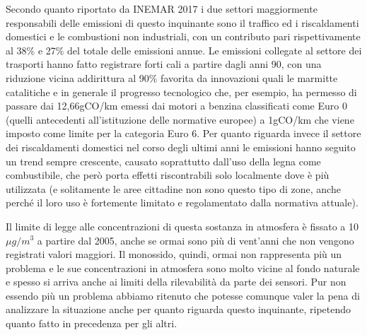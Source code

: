 \documentclass[a4paper]{report}
\begin{document}
Secondo quanto riportato da INEMAR 2017 i due settori maggiormente responsabili delle emissioni di questo inquinante sono il traffico ed i riscaldamenti domestici e le combustioni non industriali, con un contributo pari rispettivamente al 38\% e 27\% del totale delle emissioni annue. Le emissioni collegate al settore dei trasporti hanno fatto registrare forti cali a partire dagli anni 90, con una riduzione vicina addirittura al 90\% favorita da innovazioni quali le marmitte catalitiche e in generale il progresso tecnologico che, per esempio, ha permesso di passare dai 12,66gCO/km emessi dai motori a benzina classificati come Euro 0 (quelli antecedenti all'istituzione delle normative europee) a 1gCO/km che viene imposto come limite per la categoria Euro 6.
Per quanto riguarda invece il settore dei riscaldamenti domestici nel corso degli ultimi anni le emissioni hanno seguito un trend sempre crescente, causato soprattutto dall'uso della legna come combustibile, che però porta effetti riscontrabili solo localmente dove è più utilizzata (e solitamente le aree cittadine non sono questo tipo di zone, anche perché il loro uso è fortemente limitato e regolamentato dalla normativa attuale).

Il limite di legge alle concentrazioni di questa sostanza in atmosfera è fissato a 10 $\mu g/m^3$ a partire dal 2005, anche se ormai sono più di vent'anni che non vengono registrati valori maggiori. Il monossido, quindi, ormai non rappresenta più un problema e le sue concentrazioni in atmosfera sono molto vicine al fondo naturale \cite{arpa2018rapporto}
 e spesso si arriva anche ai limiti della rilevabilità da parte dei sensori.
Pur non essendo più un problema abbiamo ritenuto che potesse comunque valer la pena di analizzare la situazione anche per quanto riguarda questo inquinante, ripetendo quanto fatto in precedenza per gli altri.
\end{document}
